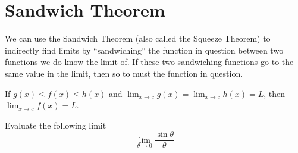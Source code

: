 \section{Sandwich Theorem}
We can use the Sandwich Theorem (also called the Squeeze Theorem) to indirectly find limits by ``sandwiching'' the function in question between two functions we do know the limit of.
If these two sandwiching functions go to the same value in the limit, then so to must the function in question.
\begin{theorem}
	If $g(x) \leq f(x) \leq h(x)$ and $\lim_{x \to c}{g(x)} = \lim_{x\to c}{h(x)} = L$, then $\lim_{x \to c}{f(x)} = L$.
\end{theorem}

\begin{example}
	Evaluate the following limit
	\begin{equation*}
		\lim_{\theta \to 0}{\frac{\sin{\theta}}{\theta}}
	\end{equation*}
\end{example}
